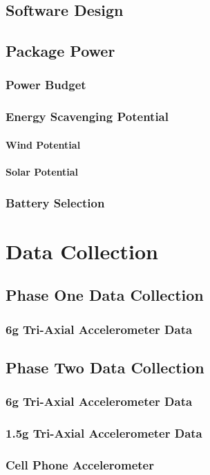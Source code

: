 \documentclass[twoside,11pt]{report}
\begin{document}
	\section{Software Design}
	\section{Package Power}
		\subsection{Power Budget}
		\subsection{Energy Scavenging Potential}
			\subsubsection{Wind Potential}
			\subsubsection{Solar Potential}
		\subsection{Battery Selection}
		
\chapter{Data Collection}
	\section{Phase One Data Collection}
		\subsection{6g Tri-Axial Accelerometer Data}
	\section{Phase Two Data Collection}
		\subsection{6g Tri-Axial Accelerometer Data}
		\subsection{1.5g Tri-Axial Accelerometer Data}
		\subsection{Cell Phone Accelerometer}
\end{document}
